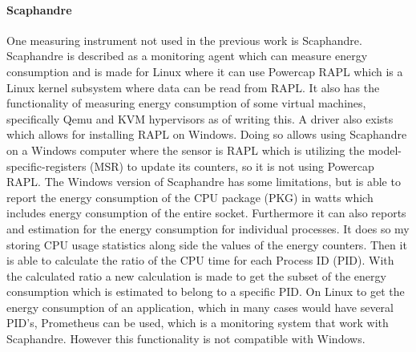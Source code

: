 \paragraph{Scaphandre}
One measuring instrument not used in the previous work is Scaphandre\cite{scaphandre}. Scaphandre is described as a monitoring agent which can measure energy consumption and is made for Linux where it can use Powercap RAPL which is a Linux kernel subsystem where data can be read from RAPL. It also has the functionality of measuring energy consumption of some virtual machines, specifically Qemu and KVM hypervisors as of writing this. A driver also exists which allows for installing RAPL on Windows. Doing so allows using Scaphandre on a Windows computer where the sensor is RAPL which is utilizing the model-specific-registers (MSR) to update its counters, so it is not using Powercap RAPL. The Windows version of Scaphandre has some limitations, but is able to report the energy consumption of the CPU package (PKG) in watts which includes energy consumption of the entire socket. Furthermore it can also reports and estimation for the energy consumption for individual processes. It does so my storing CPU usage statistics along side the values of the energy counters. Then it is able to calculate the ratio of the CPU time for each Process ID (PID). With the calculated ratio a new calculation is made to get the subset of the energy consumption which is estimated to belong to a specific PID. On Linux to get the energy consumption of an application, which in many cases would have several PID's, Prometheus can be used, which is a monitoring system that work with Scaphandre. However this functionality is not compatible with Windows.